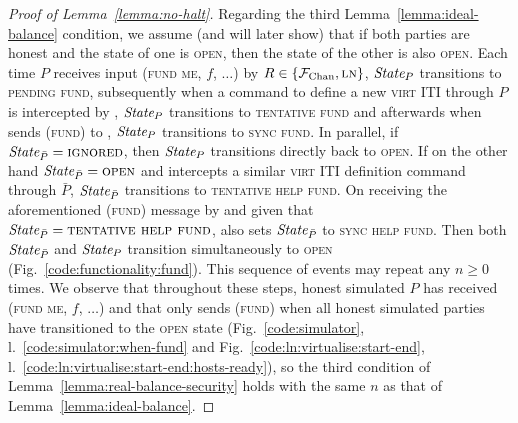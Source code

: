 \begin{proof}[Proof of Lemma~\ref{lemma:no-halt}]
  Regarding the third Lemma~\ref{lemma:ideal-balance} condition, we assume (and
  will later show) that if both parties are honest and the state of one is
  \textsc{open}, then the state of the other is also \textsc{open}. Each time
  $P$ receives input (\textsc{fund me}, $f$, $\dots$) by $R \in \{\mathcal{F}_{\mathrm{Chan}},
  \textsc{ln}\}$, $\itistate_P$ transitions to \textsc{pending fund},
  subsequently when a command to define a new \textsc{virt} ITI through $P$ is
  intercepted by \fchan, $\itistate_P$ transitions to \textsc{tentative fund}
  and afterwards when \simulator sends (\textsc{fund}) to \fchan, $\itistate_P$
  transitions to \textsc{sync fund}. In parallel, if $\itistate_{\bar{P}} =
  \textsc{ignored}$, then $\itistate_P$ transitions directly back to
  \textsc{open}. If on the other hand $\itistate_{\bar{P}} = \textsc{open}$ and
  \fchan intercepts a similar \textsc{virt} ITI definition command through
  $\bar{P}$, $\itistate_{\bar{P}}$ transitions to \textsc{tentative help fund}.
  On receiving the aforementioned (\textsc{fund}) message by \simulator and
  given that $\itistate_{\bar{P}} = \textsc{tentative help fund}$, \fchan also
  sets $\itistate_{\bar{P}}$ to \textsc{sync help fund}. Then both
  $\itistate_{\bar{P}}$ and $\itistate_P$ transition simultaneously to
  \textsc{open} (Fig.~\ref{code:functionality:fund}). This sequence of events
  may repeat any $n \geq 0$ times. We observe that throughout these steps,
  honest simulated $P$ has received (\textsc{fund me}, $f$, $\dots$) and that
  \simulator only sends (\textsc{fund}) when all honest simulated parties have
  transitioned to the \textsc{open} state (Fig.~\ref{code:simulator},
  l.~\ref{code:simulator:when-fund} and Fig.~\ref{code:ln:virtualise:start-end},
  l.~\ref{code:ln:virtualise:start-end:hosts-ready}), so the third condition of
  Lemma~\ref{lemma:real-balance-security} holds with the same $n$ as that of
  Lemma~\ref{lemma:ideal-balance}.


\end{proof}
